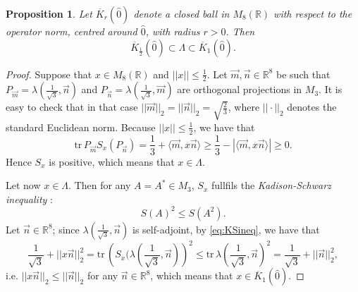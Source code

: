 \documentclass[12pt]{article}
\theoremstyle{plain}
\newtheorem{proposition}{Proposition}
\theoremstyle{definition}
\theoremstyle{remark}
\numberwithin{equation}{section}
\begin{document}
\begin{proposition}
\label{prop:LambdaAndBalls}
    Let $\overline{K}_{r}(\hat{0})$ denote a closed
    ball in $M_{8}(\mathbb{R})$ with respect to the operator norm,
    centred around $\hat{0}$, with radius $r > 0$.
    Then
    \begin{equation}
        \overline{K}_{\frac{1}{2}}(\hat{0}) \subset \Lambda \subset \overline{K}_{1}(\hat{0}).
    \end{equation}
\end{proposition}
\begin{proof}
    Suppose that $x \in M_{8}(\mathbb{R})$ and $||x|| \leq \frac{1}{2}$.
    Let $\vec{m}, \vec{n} \in \mathbb{R}^{8}$ be such that
    $P_{\vec{m}} = \lambda(\frac{1}{\sqrt{3}}, \vec{n})$ and
    $P_{\vec{n}} = \lambda(\frac{1}{\sqrt{3}}, \vec{m})$
    are orthogonal projections in $M_{3}$.
    It is easy to check that in that case
    $|| \vec{m} ||_{2} = || \vec{n} ||_{2} = \sqrt{\frac{2}{3}}$,
    where $|| \cdot||_{2}$ denotes
    the standard Euclidean norm.
    Because $||x|| \leq \frac{1}{2}$, we have that
    \begin{equation}
        \text{tr} \, P_{\vec{m}} S_{x}(P_{\vec{n}}) = 
        \frac{1}{3} + \langle \vec{m}, x \vec{n} \rangle \geq
        \frac{1}{3} - |\langle \vec{m}, x \vec{n} \rangle| \geq 0.
    \end{equation}
    Hence $S_{x}$ is positive, which means that $x \in \Lambda$.
    
    Let now $x \in \Lambda$.
    Then for any $A = A^{*} \in M_{3}$, $S_{x}$ fullfils the
    \emph{Kadison-Schwarz inequality} 
    \cite{choi1980some}:
    \begin{equation}
     \label{eq:KSineq}
        S(A)^{2} \leq S(A^{2}).
    \end{equation}
    Let $\vec{n} \in \mathbb{R}^{8}$; since $\lambda(\frac{1}{\sqrt{3}}, \vec{n})$
    is self-adjoint, by \eqref{eq:KSineq}, we have that
    \begin{equation}
        \frac{1}{\sqrt{3}} + || x \vec{n} ||_{2}^{2} = \text{tr}\, 
        \left ( S_{x}(\lambda(\frac{1}{\sqrt{3}}, \vec{n}) \right)^{2} \leq
        \text{tr}\, \lambda(\frac{1}{\sqrt{3}}, \vec{n})^{2} =
        \frac{1}{\sqrt{3}} + ||\vec{n}||_{2}^{2},
    \end{equation}
i.e. $||x\vec{n}||_{2} \leq ||\vec{n}||_{2}$ for any $\vec{n} \in \mathbb{R}^{8}$,
which means that $x \in \overline{K}_{1}(\hat{0})$.
\end{proof}
\end{document}
